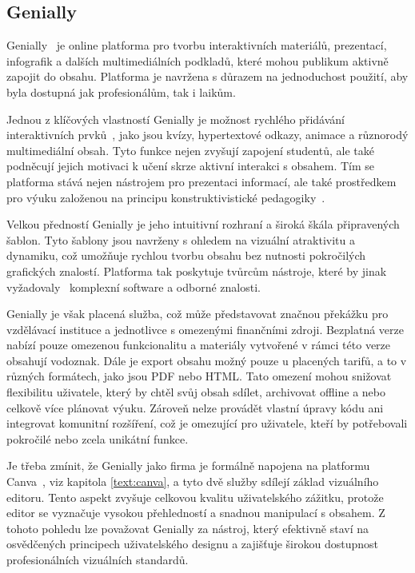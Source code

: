 \subsection{Genially}

Genially~\cite{genially} je online platforma pro tvorbu interaktivních materiálů, prezentací, infografik a dalších multimediálních podkladů, které mohou publikum aktivně zapojit do obsahu.
Platforma je navržena s důrazem na jednoduchost použití, aby byla dostupná jak profesionálům, tak i laikům.

Jednou z klíčových vlastností Genially je možnost rychlého přidávání interaktivních prvků~\cite{genially}, jako jsou kvízy, hypertextové odkazy, animace a různorodý multimediální obsah. 
Tyto funkce nejen zvyšují zapojení studentů, ale také podněcují jejich motivaci k učení skrze aktivní interakci s obsahem. 
Tím se platforma stává nejen nástrojem pro prezentaci informací, ale také prostředkem pro výuku založenou na principu konstruktivistické pedagogiky~\cite{konstruktivismus}. 

Velkou předností Genially je jeho intuitivní rozhraní a široká škála připravených šablon.
Tyto šablony jsou navrženy s ohledem na vizuální atraktivitu a dynamiku, což umožňuje rychlou tvorbu obsahu bez nutnosti pokročilých grafických znalostí.
Platforma tak poskytuje tvůrcům nástroje, které by jinak vyžadovaly~\cite{genially} komplexní software a odborné znalosti.

Genially je však placená služba, což může představovat značnou překážku pro vzdělávací instituce a jednotlivce s omezenými finančními zdroji. 
Bezplatná verze nabízí pouze omezenou funkcionalitu a materiály vytvořené v rámci této verze obsahují vodoznak.
Dále je export obsahu možný pouze u placených tarifů, a to v různých formátech, jako jsou PDF nebo HTML. 
Tato omezení mohou snižovat flexibilitu uživatele, který by chtěl svůj obsah sdílet, archivovat offline a nebo celkově více plánovat výuku. 
Zároveň nelze provádět vlastní úpravy kódu ani integrovat komunitní rozšíření, což je omezující pro uživatele, kteří by potřebovali pokročilé nebo zcela unikátní funkce.

Je třeba zmínit, že Genially jako firma je formálně napojena na platformu Canva~\cite{genially}, viz kapitola \ref{text:canva}, a tyto dvě služby sdílejí základ vizuálního editoru. 
Tento aspekt zvyšuje celkovou kvalitu uživatelského zážitku, protože editor se vyznačuje vysokou přehledností a snadnou manipulací s obsahem. 
Z tohoto pohledu lze považovat Genially za nástroj, který efektivně staví na osvědčených principech uživatelského designu a zajišťuje širokou dostupnost profesionálních vizuálních standardů.

